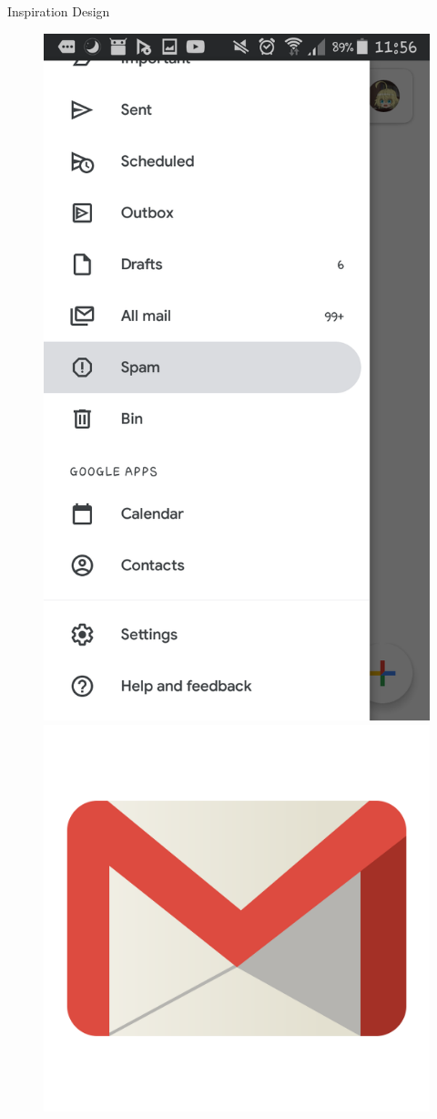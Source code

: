\documentclass[aspectratio=169]{beamer}
\begin{document}
\begin{frame}[plain]{Inspiration Design}
\begin{varwidth}{.3\textwidth}\pause
        \begin{figure}
            \centering
            \includegraphics[width=.8\textwidth]{media/gmail-screenshot.png}\\
            \vspace{.5cm}
            \includegraphics[width=.25\textwidth]{media/gmail-logo.png}
        \end{figure}

\end{varwidth}
\end{frame}
\end{document}
